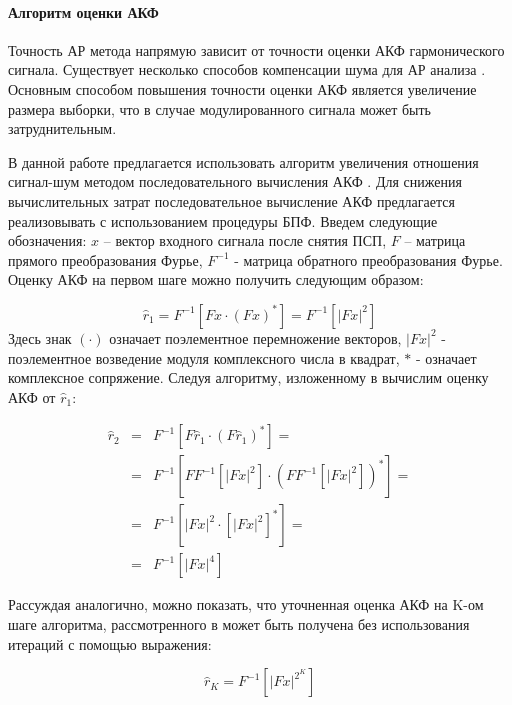 \paragraph{Алгоритм оценки АКФ}
Точность АР метода напрямую зависит от точности оценки АКФ гармонического сигнала.
Существует несколько способов компенсации шума для АР анализа \cite{kay_ar_book}.
Основным способом повышения точности оценки АКФ является увеличение размера выборки, что в случае модулированного сигнала может быть затруднительным. 

В данной работе предлагается использовать алгоритм увеличения отношения сигнал-шум методом последовательного вычисления АКФ \cite{ostanin_akf}.
Для снижения вычислительных затрат последовательное вычисление АКФ предлагается реализовывать с использованием процедуры БПФ. 
Введем следующие обозначения: ${x}$ – вектор входного сигнала после снятия ПСП, ${F}$ – матрица прямого преобразования Фурье,
${F^{-1}}$ - матрица обратного преобразования Фурье. Оценку АКФ на первом шаге можно получить следующим образом:

\begin{equation}
	\label{eq:akf_akf}
	\hat{r}_1 = F^{-1}\left[ Fx \cdot (Fx)^* \right] = F^{-1} \left[ \left| Fx \right| ^2 \right]
\end{equation}
Здесь знак ${(\cdot)}$  означает поэлементное перемножение векторов, ${\left| Fx \right| ^2}$ - поэлементное возведение модуля комплексного числа в квадрат, ${*}$ - означает
комплексное сопряжение.  Следуя алгоритму, изложенному в \cite{ostanin_akf} вычислим оценку АКФ от ${\hat{r}_1}$:

\begin{center}
\begin{eqnarray}
	\label{eq:akf_2}
	\hat{r}_2 & = & F^{-1}\left[ F \hat{r}_1 \cdot (F \hat{r}_1)^* \right] = \nonumber \\
		& = & F^{-1}	\left[ 
				FF^{-1} \left[
						\left| Fx \right| ^2
					\right]
						\cdot \left( FF^{-1} \left[ \left| Fx \right| ^2 \right]
					\right) ^*
			\right] = \nonumber \\
		& = & F^{-1} \left[ \left| Fx \right| ^2 \cdot \left[ \left| Fx \right| ^2 \right] ^* \right] =  \nonumber \\
		& = & F^{-1} \left[ \left| Fx \right| ^4 \right]
\end{eqnarray}
\end{center}

Рассуждая аналогично, можно показать, что уточненная оценка АКФ на K-ом шаге алгоритма, рассмотренного в \cite{ostanin_akf}
может быть получена без использования итераций с помощью выражения:
\begin{center}
\begin{equation}
	\label{eq:akf_3}
	\hat{r}_K = F^{-1}\left[ \left| Fx \right| ^{2^K} \right]
\end{equation}
\end{center}

